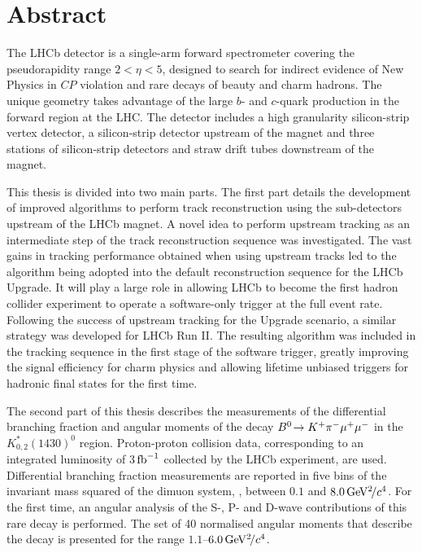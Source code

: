 \section*{Abstract}

The LHCb detector is a single-arm forward spectrometer covering the pseudorapidity range $2 < \eta < 5$, designed to search for indirect evidence of New Physics in $C\!P$ violation and rare decays of beauty and charm hadrons. The unique geometry takes advantage of the large $b$- and $c$-quark production in the forward region at the LHC. The detector includes a high granularity silicon-strip vertex detector, a silicon-strip detector upstream of the magnet and three stations of silicon-strip detectors and straw drift tubes downstream of the magnet.

This thesis is divided into two main parts. The first part details the development of improved algorithms to perform track reconstruction using the sub-detectors upstream of the LHCb magnet. A novel idea to perform upstream tracking as an intermediate step of the track reconstruction sequence was investigated. The vast gains in tracking performance obtained when using upstream tracks led to the algorithm being adopted into the default reconstruction sequence for the LHCb Upgrade. It will play a large role in allowing LHCb to become the first hadron collider experiment to operate a software-only trigger at the full event rate. Following the success of upstream tracking for the Upgrade scenario, a similar strategy was developed for LHCb Run II. The resulting algorithm was included in the tracking sequence in the first stage of the software trigger, greatly improving the signal efficiency for charm physics and allowing lifetime unbiased triggers for hadronic final states for the first time.

The second part of this thesis describes the measurements of the differential branching fraction and angular moments of the decay ${B}^0\!\rightarrow K^{+}\pi^{-}\mu^{+}\mu^{-}$ in the $K^{*}_{0,2}(1430)^{0}$ region. Proton-proton collision data, corresponding to an integrated luminosity of 3$\mbox{\,fb}^{-1}$ collected by the LHCb experiment, are used. Differential branching fraction measurements are reported in five bins of the invariant mass squared of the dimuon system, \qsq, between $0.1$ and $8.0{\mathrm{\,Ge\kern -0.1em V^2\!/}c^4}$. For the first time, an angular analysis of the S-, P- and D-wave contributions of this rare decay is performed. The set of 40 normalised angular moments that describe the decay is presented for the \qsq range $1.1$--$6.0{\mathrm{\,Ge\kern -0.1em V^2\!/}c^4}$. 